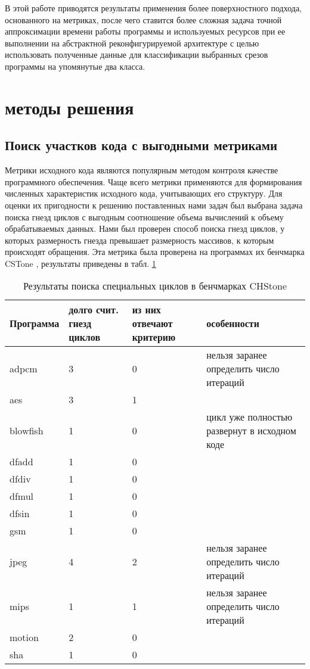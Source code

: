 \documentclass[utf8]{psta}%
\begin{document}
В этой работе приводятся результаты применения более поверхностного подхода, основанного на метриках, после чего ставится более сложная задача точной аппроксимации времени работы программы и используемых ресурсов при ее выполнении на абстрактной реконфигурируемой архитектуре с целью использовать полученные данные для классификации выбранных срезов программы на упомянутые два класса.

\section{методы решения}

\subsection{Поиск участков кода с выгодными метриками}

Метрики исходного кода являются популярным методом контроля качестве программного обеспечения. Чаще всего метрики применяются для формирования численных характеристик исходного кода, учитывающих его структуру. Для оценки их пригодности к решению поставленных нами задач был выбрана задача поиска гнезд циклов с выгодным соотношение объема вычислений к объему обрабатываемых данных.
Нами был проверен способ поиска гнезд циклов, у которых размерность гнезда превышает размерность массивов, к которым происходят обращения. Эта метрика была проверена на программах их бенчмарка CSTone \cite{Hara2009}, результаты приведены в табл. \ref{table:CHStoneSingularLoops}

\begin{table}
    \begin{tabular}{ | p{1.5cm} | p{2cm} | p{1cm} | p{6cm} |}
    \hline
    Программа & долго счит. гнезд циклов & из них отвечают критерию & особенности \\ \hline
    adpcm & 3 & 0 & нельзя заранее определить число итераций \\ \hline
    aes & 3 & 1 &  \\ \hline
    blowfish & 1 & 0 & цикл уже полностью развернут в исходном коде \\ \hline
    dfadd & 1 & 0 &  \\ \hline
    dfdiv & 1 & 0 &  \\ \hline
    dfmul & 1 & 0 &  \\ \hline
    dfsin & 1 & 0 &  \\ \hline
    gsm & 1 & 0 &  \\ \hline
    jpeg & 4 & 2 & нельзя заранее определить число итераций \\ \hline
    mips & 1 & 1 & нельзя заранее определить число итераций \\ \hline
    motion & 2 & 0 &  \\ \hline
    sha & 1 & 0 &  \\ \hline
    \end{tabular} 
    \caption{Результаты поиска специальных циклов в бенчмарках CHStone}
    \label{table:CHStoneSingularLoops}
\end{table}
\end{document}

